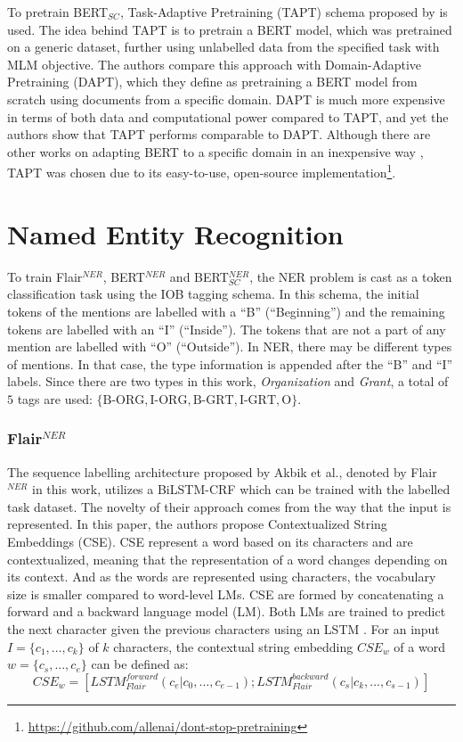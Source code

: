 \documentclass{report}
\theoremstyle{definition}
\theoremstyle{remark}
\begin{document}
To pretrain BERT$_{SC}$, Task-Adaptive Pretraining (TAPT) schema proposed by \cite{DontStop} is used. The idea behind TAPT is to pretrain a BERT model, which was pretrained on a generic dataset, further using unlabelled data from the specified task with MLM objective. The authors compare this approach with Domain-Adaptive Pretraining (DAPT), which they define as pretraining a BERT model from scratch using documents from a specific domain. DAPT is much more expensive in terms of both data and computational power compared to TAPT, and yet the authors show that TAPT performs comparable to DAPT. Although there are other works on adapting BERT to a specific domain in an inexpensive way \cite{exBERT,word2vectoBERT}, TAPT was chosen due to its easy-to-use, open-source implementation\footnote{\url{https://github.com/allenai/dont-stop-pretraining}}.


\section{Named Entity Recognition}
\label{sec:NERMEThod}

To train  Flair$^{NER}$, BERT$^{NER}$ and BERT$^{NER}_{SC}$, the NER problem is cast as a token classification task using the IOB tagging schema. In this schema, the initial tokens of the mentions are labelled with a ``B'' (``Beginning'') and the remaining tokens are labelled with an ``I'' (``Inside''). The tokens that are not a part of any mention are labelled with ``O'' (``Outside''). In NER, there may be different types of mentions. In that case, the type information is appended after the ``B'' and ``I'' labels. Since there are two types in this work, \textit{Organization} and \textit{Grant}, a total of $5$ tags are used: $\{ \text{B-ORG}, \text{I-ORG}, \text{B-GRT}, \text{I-GRT}, \text{O} \}$.

\subsubsection{Flair$^{NER}$}
The sequence labelling architecture proposed by Akbik et al., denoted by Flair$^{NER}$ in this work, utilizes a BiLSTM-CRF \cite{BiLSTMCRF} which can be trained with the labelled task dataset. The novelty of their approach comes from the way that the input is represented. In this paper, the authors propose Contextualized String Embeddings (CSE). CSE represent a word based on its characters and are contextualized, meaning that the representation of a word changes depending on its context. And as the words are represented using characters, the vocabulary size is smaller compared to word-level LMs. CSE are formed by concatenating a forward and a backward language model (LM). Both LMs are trained to predict the next character given the previous characters using an LSTM \cite{lstm}. For an input $I=\{c_1,...,c_k\}$ of $k$ characters, the contextual string embedding $CSE_w$ of a word $w=\{c_s,...,c_e\}$ can be defined as:
\begin{equation}
    CSE_w = [ LSTM^{forward}_{Flair}(c_e | c_0,...,c_{e-1}); LSTM^{backward}_{Flair}(c_s | c_k,...,c_{s-1}) ]
\end{equation}
\end{document}

